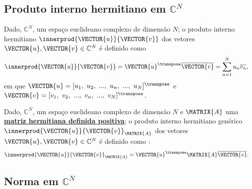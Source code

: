 \subsection{Produto interno hermitiano em $\mathbb{C}^N$}

\begin{definition}
Dado, $\mathbb{C}^N$, um espaço euclideano complexo de dimensão $N$;
o produto interno hermitiano $\innerprod{\VECTOR{u}}{\VECTOR{v}}$ dos vetores $\VECTOR{u},\VECTOR{v} \in \mathbb{C}^N$
é definido como \cite[pp. 44]{d2019hermitian} \cite[pp. 242]{damiano2011course}
\begin{equation}
\innerprod{\VECTOR{u}}{\VECTOR{v}}=\VECTOR{u}^{\transpose} \overline{\VECTOR{v}}=\sum_{n=1}^N u_n \overline{v_n},
\end{equation} 
em que $\VECTOR{u}=[u_1,~u_2,~...,~u_n,~...,~u_N]^{\transpose}$ e $\VECTOR{v}=[v_1,~v_2,~...,~v_n,~...,~v_N]^{\transpose}$.
\end{definition}

\begin{definition}
Dado, $\mathbb{C}^N$, um espaço euclideano complexo de dimensão $N$ e
$\MATRIX{A}$ uma \hyperref[def:hermitianapositivamatrix0]{\textbf{matriz hermitiana definida positiva}};
o produto interno hermitiano genérico $\innerprod{\VECTOR{u}}{\VECTOR{v}}_{\MATRIX{A}}$ 
dos vetores $\VECTOR{u},\VECTOR{v} \in \mathbb{C}^N$ 
é definido como \cite[pp. 1358]{weisstein2002crc}:
\begin{equation}
\innerprod{\VECTOR{u}}{\VECTOR{v}}_{\MATRIX{A}}=\VECTOR{u}^{\transpose} \MATRIX{A} \overline{\VECTOR{v}}.
\end{equation} 
\end{definition}

\subsection{Norma em $\mathbb{C}^N$}

